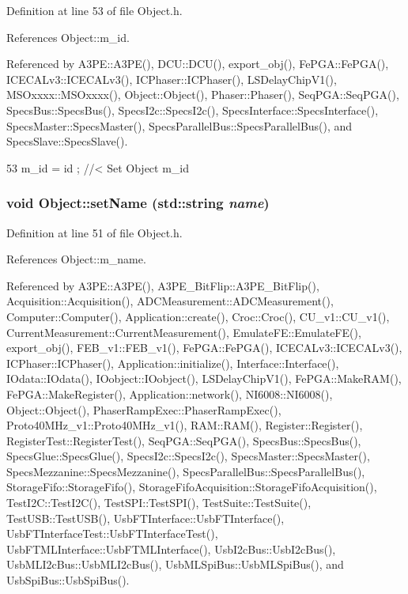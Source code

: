 Definition at line 53 of file Object.h.

References Object::m\_\-id.

Referenced by A3PE::A3PE(), DCU::DCU(), export\_\-obj(), FePGA::FePGA(), ICECALv3::ICECALv3(), ICPhaser::ICPhaser(), LSDelayChipV1(), MSOxxxx::MSOxxxx(), Object::Object(), Phaser::Phaser(), SeqPGA::SeqPGA(), SpecsBus::SpecsBus(), SpecsI2c::SpecsI2c(), SpecsInterface::SpecsInterface(), SpecsMaster::SpecsMaster(), SpecsParallelBus::SpecsParallelBus(), and SpecsSlave::SpecsSlave().


\begin{DoxyCode}
53 { m_id    = id    ; } //< Set Object m_id
\end{DoxyCode}
\hypertarget{classObject_ae30fea75683c2d149b6b6d17c09ecd0c}{
\subsubsection[{setName}]{\setlength{\rightskip}{0pt plus 5cm}void Object::setName (std::string {\em name})}}
\label{classObject_ae30fea75683c2d149b6b6d17c09ecd0c}


Definition at line 51 of file Object.h.

References Object::m\_\-name.

Referenced by A3PE::A3PE(), A3PE\_\-BitFlip::A3PE\_\-BitFlip(), Acquisition::Acquisition(), ADCMeasurement::ADCMeasurement(), Computer::Computer(), Application::create(), Croc::Croc(), CU\_\-v1::CU\_\-v1(), CurrentMeasurement::CurrentMeasurement(), EmulateFE::EmulateFE(), export\_\-obj(), FEB\_\-v1::FEB\_\-v1(), FePGA::FePGA(), ICECALv3::ICECALv3(), ICPhaser::ICPhaser(), Application::initialize(), Interface::Interface(), IOdata::IOdata(), IOobject::IOobject(), LSDelayChipV1(), FePGA::MakeRAM(), FePGA::MakeRegister(), Application::network(), NI6008::NI6008(), Object::Object(), PhaserRampExec::PhaserRampExec(), Proto40MHz\_\-v1::Proto40MHz\_\-v1(), RAM::RAM(), Register::Register(), RegisterTest::RegisterTest(), SeqPGA::SeqPGA(), SpecsBus::SpecsBus(), SpecsGlue::SpecsGlue(), SpecsI2c::SpecsI2c(), SpecsMaster::SpecsMaster(), SpecsMezzanine::SpecsMezzanine(), SpecsParallelBus::SpecsParallelBus(), StorageFifo::StorageFifo(), StorageFifoAcquisition::StorageFifoAcquisition(), TestI2C::TestI2C(), TestSPI::TestSPI(), TestSuite::TestSuite(), TestUSB::TestUSB(), UsbFTInterface::UsbFTInterface(), UsbFTInterfaceTest::UsbFTInterfaceTest(), UsbFTMLInterface::UsbFTMLInterface(), UsbI2cBus::UsbI2cBus(), UsbMLI2cBus::UsbMLI2cBus(), UsbMLSpiBus::UsbMLSpiBus(), and UsbSpiBus::UsbSpiBus().


